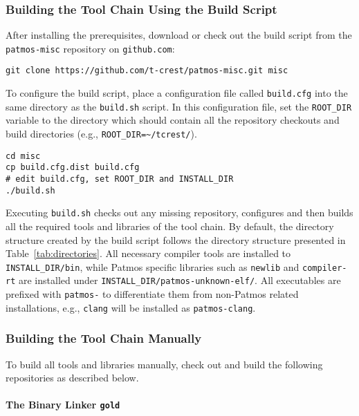 \subsubsection{Building the Tool Chain Using the Build Script}
\label{sec:buildscript}

After installing the prerequisites, download or check out the build script 
from the \texttt{patmos-misc} repository on \texttt{github.com}:

\begin{verbatim}
git clone https://github.com/t-crest/patmos-misc.git misc
\end{verbatim}

To configure the build script, place a configuration file called \texttt{build.cfg}
into the same directory as the \texttt{build.sh} script. 
In this configuration file, set the \texttt{ROOT\_DIR} variable to the directory which should contain all
the repository checkouts and build directories (e.g., \texttt{ROOT\_DIR=\textasciitilde/tcrest/}).

\begin{verbatim}
cd misc
cp build.cfg.dist build.cfg
# edit build.cfg, set ROOT_DIR and INSTALL_DIR
./build.sh
\end{verbatim}

Executing \texttt{build.sh} checks out any missing repository, configures and then builds
all the required tools and libraries of the tool chain. 
By default, the directory structure created by the build script follows the directory structure presented in Table~\ref{tab:directories}. 
All necessary compiler tools are installed to 
\texttt{INSTALL\_DIR/bin}, while Patmos specific libraries such as \texttt{newlib} and 
\texttt{compiler-rt} are installed under \texttt{INSTALL\_DIR/patmos-unknown-elf/}.
All executables are prefixed with \texttt{patmos-} to differentiate them from non-Patmos related
installations, e.g., \texttt{clang} will be installed as \texttt{patmos-clang}.


\subsubsection{Building the Tool Chain Manually}
\label{sec:manual_build}

To build all tools and libraries manually, check out and build the following repositories as described below.

\paragraph{The Binary Linker \texttt{gold}} \hfill\\

